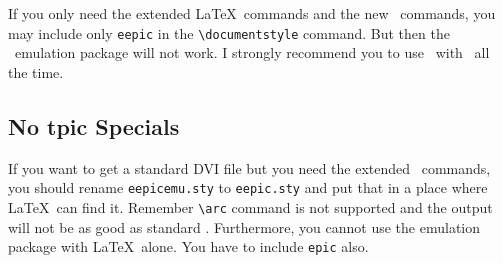 If you only need the extended \LaTeX\ commands and the new
\eepic\ commands, you may include only \verb|eepic| in the
\verb|\documentstyle| command. But then the \eepic\ emulation
package will not work. I strongly recommend you to use
\eepic\ with \epic\ all the time.

\subsection{No tpic Specials}
If you want to get a standard DVI file but you need the extended
\eepic\ commands, you should rename \verb|eepicemu.sty| to
\verb|eepic.sty| and put that in a place where \LaTeX\ can find
it. Remember \verb|\arc| command is not supported and the output
will not be as good as standard \eepic. Furthermore, you cannot
use the emulation package with \LaTeX\ alone. You have to include
\verb|epic| also.



